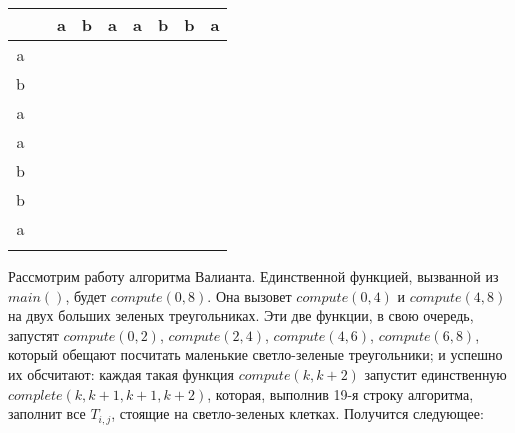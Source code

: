 \documentclass[russian,table]{article}
\begin{document}
\begin{table}[h]
\centering
\begin{tabular}{c|cccccccc}
 &  & a & b & a & a & b & b & a \\ \hline
a & \cellcolor[HTML]{00FF00}\backslashbox{}{} & \cellcolor[HTML]{00FF00} & \cellcolor[HTML]{009901} & \cellcolor[HTML]{009901} & \cellcolor[HTML]{FD6864} & \cellcolor[HTML]{FD6864} & \cellcolor[HTML]{FD6864} & \cellcolor[HTML]{FD6864} \\
b &  & \cellcolor[HTML]{00FF00}\backslashbox{}{} & \cellcolor[HTML]{009901} & \cellcolor[HTML]{009901} & \cellcolor[HTML]{FD6864} & \cellcolor[HTML]{FD6864} & \cellcolor[HTML]{FD6864} & \cellcolor[HTML]{FD6864} \\
a &  &  & \cellcolor[HTML]{00FF00}\backslashbox{}{} & \cellcolor[HTML]{00FF00} & \cellcolor[HTML]{FD6864} & \cellcolor[HTML]{FD6864} & \cellcolor[HTML]{FD6864} & \cellcolor[HTML]{FD6864} \\
a &  &  &  & \cellcolor[HTML]{00FF00}\backslashbox{}{} & \cellcolor[HTML]{FD6864} & \cellcolor[HTML]{FD6864} & \cellcolor[HTML]{FD6864} & \cellcolor[HTML]{FD6864} \\
b &  &  &  &  & \cellcolor[HTML]{00FF00}\backslashbox{}{} & \cellcolor[HTML]{00FF00} & \cellcolor[HTML]{009901} & \cellcolor[HTML]{009901} \\
b &  &  &  &  &  & \cellcolor[HTML]{00FF00}\backslashbox{}{} & \cellcolor[HTML]{009901} & \cellcolor[HTML]{009901} \\
a &  &  &  &  &  &  & \cellcolor[HTML]{00FF00}\backslashbox{}{} & \cellcolor[HTML]{00FF00} \\
 &  &  &  &  &  &  &  & \cellcolor[HTML]{00FF00}\backslashbox{}{}
\end{tabular}
\end{table}

Рассмотрим работу алгоритма Валианта. Единственной функцией, вызванной из $main()$, будет $compute(0, 8)$. Она вызовет $compute(0, 4)$ и $compute(4, 8)$ на двух больших зеленых треугольниках. Эти две функции, в свою очередь, запустят $compute(0, 2)$, $compute(2, 4)$, $compute(4, 6)$, $compute(6, 8)$, который обещают посчитать маленькие светло-зеленые треугольники; и успешно их обсчитают: каждая такая функция $compute(k, k+2)$ запустит единственную $complete(k, k+1, k+1, k+2)$, которая, выполнив 19-я строку алгоритма, заполнит все $T_{i, j}$, стоящие на светло-зеленых клетках. Получится следующее:
\end{document}
